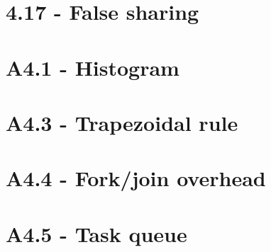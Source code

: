 \documentclass[a4paper,11pt,twoside]{article}
\begin{document}
\section{4.17 - False sharing}

\section{A4.1 - Histogram}

\section{A4.3 - Trapezoidal rule}

\section{A4.4 - Fork/join overhead}

\section{A4.5 - Task queue} 




\end{document}
